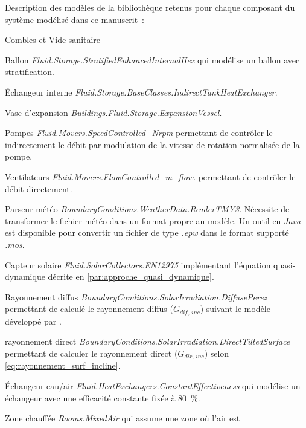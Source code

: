 Description des modèles de la bibliothèque 
retenus pour chaque composant du système modélisé dans ce manuscrit~: \label{modele_solaires_list}
\begin{blockdescription}{Combles et Vide sanitaire}
    \item [Ballon] \textit{Fluid.Storage.StratifiedEnhancedInternalHex} qui modélise
                   un ballon avec stratification.
    \item [Échangeur interne] \textit{Fluid.Storage.BaseClasses.IndirectTankHeatExchanger}.
    \item [Vase d’expansion] \textit{Buildings.Fluid.Storage.ExpansionVessel}.
    \item [Pompes] \textit{Fluid.Movers.SpeedControlled\_Nrpm} permettant
                   de contrôler le indirectement le débit par modulation de la vitesse
                   de rotation normalisée de la pompe.
    \item [Ventilateurs] \textit{Fluid.Movers.FlowControlled\_m\_flow}.
                          permettant de contrôler le débit directement.
    \item [Parseur météo] \textit{BoundaryConditions.WeatherData.ReaderTMY3}.
                          Nécessite de transformer le fichier météo dans un format propre au modèle.
                          Un outil en \textit{Java} est disponible pour convertir un fichier de
                          type \textit{.epw} dans le format supporté \textit{.mos}.
    \item [Capteur solaire] \textit{Fluid.SolarCollectors.EN12975} implémentant
          l’équation quasi-dynamique décrite en \ref{par:approche_quasi_dynamique}.
    \item [Rayonnement diffus] \textit{BoundaryConditions.SolarIrradiation.DiffusePerez} permettant
          de calculé le rayonnement diffus ($G_{dif,\,inc}$) suivant le modèle développé par \textcite{Perez1990271}.
    \item [rayonnement direct] \textit{BoundaryConditions.SolarIrradiation.DirectTiltedSurface}
          permettant de calculer le rayonnement direct ($G_{dir,\,inc}$) selon \eqref{eq:rayonnement_surf_incline}.
    \item [Échangeur eau/air] \textit{Fluid.HeatExchangers.ConstantEffectiveness} qui
          modélise un échangeur avec une efficacité constante fixée à \SI{80}{\percent}.
    \item [Zone chauffée] \textit{Rooms.MixedAir} qui assume une zone où l’air est

\end{blockdescription}
